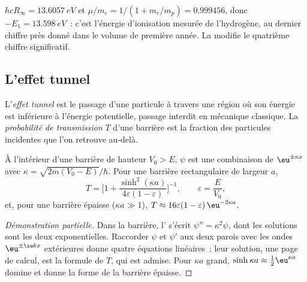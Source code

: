 \begin{example}\label{ex:b3:quantum-model-systems:ie}
$hcR_\infty = \qty{13.6057}{eV}$ et $\mu/m_e = 1/(1 + m_e/m_p) = 0.999456$, donc
$-E_1 = \qty{13.598}{eV}$~: c'est l'énergie d'ionisation mesurée de
l'hydrogène, au dernier chiffre près donné dans le volume de première
année. La  modifie le quatrième chiffre significatif.
\end{example}

\subsection*{L'effet tunnel}

\begin{definition}\label{def:b3:quantum-model-systems:tunnelling}
L'\emph{effet tunnel} est le passage d'une particule à
travers une région où son énergie est inférieure à l'énergie
potentielle, passage interdit en mécanique classique. La
\emph{probabilité de transmission}
$T$ d'une barrière est la fraction des particules incidentes que l'on
retrouve au-delà.
\end{definition}

\begin{proposition}\label{prop:b3:quantum-model-systems:barrier}
À l'intérieur d'une barrière de hauteur $V_0 > E$, $\psi$ est une
combinaison de
$\eu^{\pm\kappa x}$ avec $\kappa = \sqrt{2m(V_0 - E)}/\hbar$. Pour une
barrière rectangulaire de largeur $a$,
\[
T = \Big[1 + \frac{\sinh^2(\kappa a)}{4\varepsilon(1-\varepsilon)}\Big]^{-1},
\qquad \varepsilon = \frac{E}{V_0},
\]
et, pour une barrière épaisse ($\kappa a \gg 1$), $T \approx 16\varepsilon(1-\varepsilon)
\,\eu^{-2\kappa a}$.
\end{proposition}

\begin{proof}[Démonstration partielle]
Dans la barrière, l' s'écrit $\psi'' = \kappa^2\psi$,
dont les solutions sont les deux exponentielles. Raccorder $\psi$ et
$\psi'$ aux deux parois avec les ondes $\eu^{\pm\iu kx}$ extérieures donne
quatre équations linéaires~; leur solution, une page de calcul, est la
formule de $T$, qui est admise. Pour
$\kappa a$ grand, $\sinh\kappa a \approx \frac12\eu^{\kappa a}$ domine et
donne la forme de la barrière épaisse.
\end{proof}

